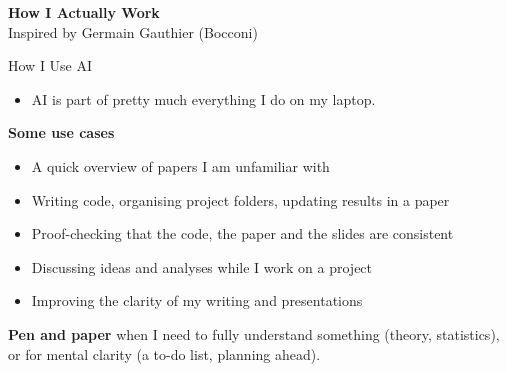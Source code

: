 \documentclass[svgnames,x11names,dvipsnames]{beamer}
\begin{document}

\begin{frame}[plain]
  \centering
  \vfill
  {\LARGE \textbf{\textcolor{titleblue}{How I Actually Work}}}\\[0.4cm]
  {Inspired by Germain Gauthier (Bocconi)}
  \vfill
\end{frame}

\begin{frame}{How I Use AI}

\begin{itemize}
    \item AI is part of pretty much everything I do on my laptop.
\end{itemize}

\vspace{0.2cm}

\textbf{Some use cases}
\begin{itemize}
    \setlength{\itemsep}{3pt}
    \item A quick overview of papers I am unfamiliar with
    \item Writing code, organising project folders, updating results in a paper
    \item Proof-checking that the code, the paper and the slides are consistent
    \item Discussing ideas and analyses while I work on a project
    \item Improving the clarity of my writing and presentations
\end{itemize}

\vspace{0.4cm}

\textbf{Pen and paper} when I need to fully understand something (theory, statistics), or for mental clarity (a to-do list, planning ahead).

\end{frame}
\end{document}
